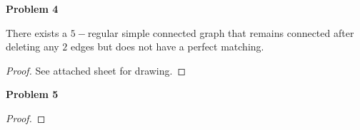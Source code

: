 \documentclass{article}
\newenvironment{claim}[2][Claim]{\begin{trivlist}
		\item[\hskip \labelsep {\bfseries #1}\hskip \labelsep {\bfseries #2}]}{\end{trivlist}}
\begin{document}
\noindent \textbf{Problem 4}
\begin{claim}{}
There exists a $5-$regular simple connected graph that remains connected after deleting any $2$ edges but does not have a perfect matching.
\end{claim}
\begin{proof}
See attached sheet for drawing.
\end{proof}

\noindent \textbf{Problem 5}
\begin{claim}{}

\end{claim}
\begin{proof}

\end{proof}
\end{document}
